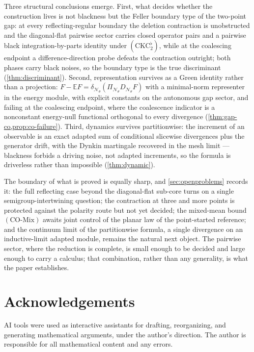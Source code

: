 \documentclass[reqno,final,11pt]{amsart}
\theoremstyle{plain}
\theoremstyle{definition}
\theoremstyle{remark}
\newcommand{\E}{\mathbb E}
\newcommand{\cN}{\mathcal N}
\newcommand{\DN}{D_{\cN_\theta}}
\newcommand{\divN}{\delta_{\cN_\theta}}
\newcommand{\PiN}{\Pi_{\cN_\theta}}
\newcommand{\COmix}{(\mathrm{CO\text{-}Mix})}
\begin{document}
Three structural conclusions emerge. First, what decides whether the
construction lives is not blackness but the Feller boundary type of the
two-point gap: at every reflecting-regular boundary the deletion
contraction is unobstructed and the diagonal-flat pairwise sector carries
closed operator pairs and a pairwise black integration-by-parts identity
under $(\mathrm{CKC}_2^{\flat})$, while at the coalescing endpoint a
difference-direction probe defeats the contraction outright; both phases
carry black noises, so the boundary type is the true discriminant
(\cref{thm:discriminant}). Second, representation survives as a Green
identity rather than a projection: $F-\E F=\divN(\PiN\DN F)$ with a
minimal-norm representer in the energy module, with explicit
constants on the autonomous gap sector, and failing at the coalescing
endpoint, where the coalescence indicator is a nonconstant energy-null
functional orthogonal to every divergence
(\cref{thm:gap-co,prop:co-failure}). Third, dynamics survives
partitionwise: the increment of an observable is an exact adapted sum of
conditional slicewise divergences plus the generator drift, with the
Dynkin martingale recovered in the mesh limit --- blackness forbids a
driving noise, not adapted increments, so the formula is driverless rather
than impossible (\cref{thm:dynamic}).

The boundary of what is proved is equally sharp, and
\cref{sec:openproblems} records it: the full reflecting case beyond the
diagonal-flat sub-core turns on a single semigroup-intertwining question;
the contraction at three and more points is protected against the polarity
route but not yet decided; the mixed-mean bound $\COmix$ awaits joint
control of the planar law of the point-started reference; and the
continuum limit of the partitionwise formula, a single divergence on an
inductive-limit adapted module, remains the natural next object. The
pairwise sector, where the reduction is complete, is small enough to be
decided and large enough to carry a calculus; that combination, rather
than any generality, is what the paper establishes.

\section*{Acknowledgements}
AI tools were used as interactive assistants for drafting, reorganizing,
and generating mathematical arguments, under the author's direction. The
author is responsible for all mathematical content and any errors.
\end{document}
